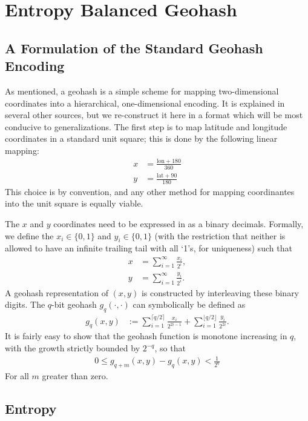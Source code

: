 \documentclass[nips13submit_09,times,art10]{article} %
\begin{document}
\section{Entropy Balanced Geohash}  \label{sec:geohash}

\subsection{A Formulation of the Standard Geohash Encoding}

As mentioned, a geohash is a simple scheme for mapping two-dimensional coordinates into a
hierarchical, one-dimensional encoding. It is explained in several other sources, but we
re-construct it here in a format which will be most conducive to generalizations.
The first step is to map latitude and longitude coordinates in a
standard unit square; this is done by the following linear mapping:
\begin{align}
x &= \frac{\text{lon} + 180}{360} \\
y &= \frac{\text{lat} + 90}{180}
\end{align}
This choice is by convention, and any other method for mapping coordinantes
into the unit square is equally viable.

The $x$ and $y$ coordinates need to be expressed in as a binary decimals.
Formally, we define the $x_i \in \{0,1 \}$ and $y_i \in \{0,1\}$
(with the restriction that neither is allowed to have an infinite trailing
tail with all `1's, for uniqueness) such that
\begin{align}
x &= \sum_{i=1}^{\infty} \frac{x_i}{2^i},\\
y &= \sum_{i=1}^{\infty} \frac{y_i}{2^i}.
\end{align}
A geohash representation of $(x,y)$ is constructed by interleaving these
binary digits. The $q$-bit geohash $g_q(\cdot,\cdot)$ can symbolically
be defined as
\begin{align}
g_q(x,y) &:=  \sum_{i=1}^{\lceil q/2 \rceil} \frac{x_i}{2^{2i-1}} +
              \sum_{i=1}^{\lfloor q/2 \rfloor} \frac{y_i}{2^{2i}}.
\end{align}
It is fairly easy to show that the geohash function is monotone increasing
in $q$, with the growth strictly bounded by $2^{-q}$, so that
\begin{align}
0 \leq g_{q+m}(x,y) - g_{q}(x,y) < \frac{1}{2^q}
\end{align}
For all $m$ greater than zero.

\subsection{Entropy}
\end{document}
